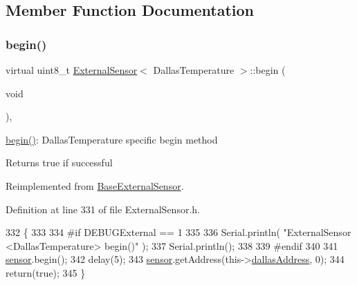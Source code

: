 \subsection{Member Function Documentation}
\mbox{\label{class_external_sensor_3_01_dallas_temperature_01_4_ac5275129b05e2ff8df45d5b222a661d9}} 
\subsubsection{\texorpdfstring{begin()}{begin()}}
{\footnotesize\ttfamily virtual uint8\+\_\+t \hyperlink{class_external_sensor}{External\+Sensor}$<$ Dallas\+Temperature $>$\+::begin (\begin{DoxyParamCaption}\item[{void}]{ }\end{DoxyParamCaption})\hspace{0.3cm}{\ttfamily [inline]}, {\ttfamily [virtual]}}

\hyperlink{class_external_sensor_3_01_dallas_temperature_01_4_ac5275129b05e2ff8df45d5b222a661d9}{begin()}\+: Dallas\+Temperature specific begin method

\begin{DoxyReturn}{Returns}
true if successful 
\end{DoxyReturn}


Reimplemented from \hyperlink{class_base_external_sensor_a87d132803d4f4fdd4e66332809f0c9a0}{Base\+External\+Sensor}.



Definition at line 331 of file External\+Sensor.\+h.


\begin{DoxyCode}
332     \{
333     
334 \textcolor{preprocessor}{    #if DEBUGExternal == 1 }
335 
336         Serial.println( \textcolor{stringliteral}{"ExternalSensor <DallasTemperature> begin()"} );
337         Serial.println();
338     
339 \textcolor{preprocessor}{    #endif}
340 
341         \hyperlink{class_external_sensor_3_01_dallas_temperature_01_4_adb6ba4fcdedef95ad8f6b0c9b6c0f9d1}{sensor}.begin(); 
342         delay(5);
343         \hyperlink{class_external_sensor_3_01_dallas_temperature_01_4_adb6ba4fcdedef95ad8f6b0c9b6c0f9d1}{sensor}.getAddress(this->\hyperlink{class_external_sensor_3_01_dallas_temperature_01_4_a7d9e9d2893e453638fcf440e5d8d9082}{dallasAddress}, 0);   
344         \textcolor{keywordflow}{return}(\textcolor{keyword}{true});
345     \}
\end{DoxyCode}
\mbox{\label{class_external_sensor_3_01_dallas_temperature_01_4_a1e725d9338314515d4e5dc456ed6a6c8}} 
